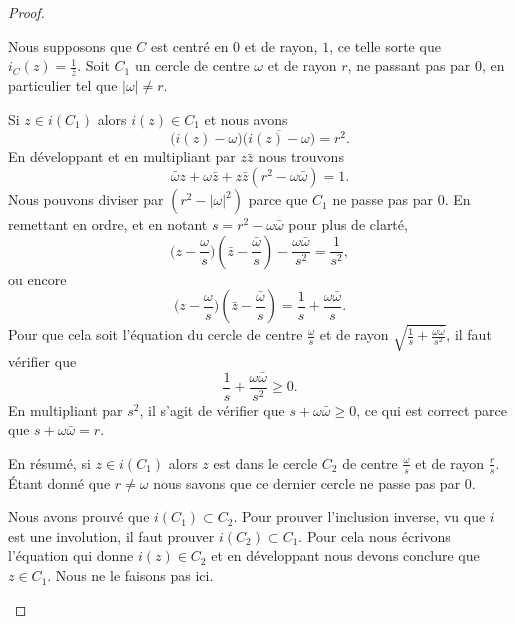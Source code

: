 \begin{proof}
\begin{enumerate}
		      \begin{subproof}
			      Nous supposons que \( C\) est centré en \( 0\) et de rayon, \( 1\), ce telle sorte que \( i_C(z)=\frac{1}{ \bar z }\). Soit \( C_1\) un cercle de centre \( \omega\) et de rayon \( r\), ne passant pas par \( 0\), en particulier tel que \( | \omega |\neq r\).

			      Si \( z\in i(C_1)\) alors \( i(z)\in C_1\) et nous avons
			      \begin{equation}
				      \big( i(z)-\omega \big)\overline{ \big( i(z)-\omega \big)}=r^2.
			      \end{equation}
			      En développant et en multipliant par \( z\bar z\) nous trouvons
			      \begin{equation}
				      \bar \omega z+\omega\bar z+z\bar z(r^2-\omega\bar\omega)=1.
			      \end{equation}
			      Nous pouvons diviser par \( (r^2-| \omega |^2)\) parce que \( C_1\) ne passe pas par \( 0\). En remettant en ordre, et en notant \( s=r^2-\omega\bar \omega\) pour plus de clarté,
			      \begin{equation}
				      \big( z-\frac{ \omega }{ s } \big)(\bar z-\frac{ \bar\omega }{ s })-\frac{ \omega\bar \omega }{ s^2 }=\frac{1}{ s^2 },
			      \end{equation}
			      ou encore
			      \begin{equation}
				      \big( z-\frac{ \omega }{ s } \big)(\bar z-\frac{ \bar\omega }{ s })=\frac{1}{ s }+\frac{ \omega\bar \omega }{ s }.
			      \end{equation}
			      Pour que cela soit l'équation du cercle de centre \( \frac{ \omega }{ s }\) et de rayon \( \sqrt{ \frac{1}{ s }+\frac{ \omega\bar\omega }{ s^2 } }\), il faut vérifier que
			      \begin{equation}
				      \frac{1}{ s }+\frac{ \omega\bar \omega }{ s^2 }\geq 0.
			      \end{equation}
			      En multipliant par \( s^2\), il s'agit de vérifier que \( s+\omega\bar \omega\geq 0\), ce qui est correct parce que \( s+\omega\bar\omega=r\).

			      En résumé, si \( z\in i(C_1)\) alors \( z\) est dans le cercle \( C_2\) de centre \( \frac{ \omega }{ s }\) et de rayon \( \frac{ r }{ s }\). Étant donné que \( r\neq \omega\) nous savons que ce dernier cercle ne passe pas par \( 0\).

			      Nous avons prouvé que \( i(C_1)\subset C_2\). Pour prouver l'inclusion inverse, vu que \( i\) est une involution, il faut prouver \( i(C_2)\subset C_1\). Pour cela nous écrivons l'équation qui donne \(i(z)\in C_2 \) et en développant nous devons conclure que \( z\in C_1\). Nous ne le faisons pas ici.


\end{subproof}
\end{enumerate}
\end{proof}
